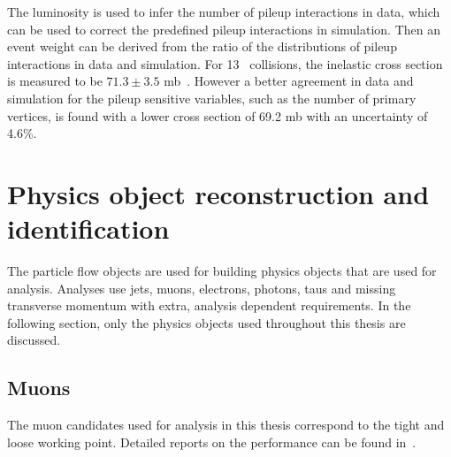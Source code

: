 The luminosity is used to infer the number of pileup interactions in data, which can be used to correct the predefined pileup interactions in simulation. Then an event weight can be derived from the ratio of the distributions of pileup interactions in data and simulation. For 13 \TeV\ collisions, the inelastic cross section is measured to be $71.3\pm3.5$ mb~\cite{CMS-PAS-FSQ-15-005}. However a better agreement in data and simulation for the pileup sensitive variables, such as the number of primary vertices, is found with a lower cross section of 69.2 mb with an uncertainty of 4.6\%. %




\section{Physics object reconstruction and identification}
\label{sec:PhysicsObject}
The particle flow objects are used for building physics objects that are used for analysis. Analyses use jets, muons, electrons, photons, taus and missing transverse momentum \ptmisvec with extra, analysis dependent requirements. In the following section, only the physics objects used throughout this thesis are discussed. 

\subsection{Muons}
\label{sec:MuonID}
The muon candidates used for analysis in this thesis correspond to the tight and loose working point. Detailed reports on the performance can be found in~\cite{CMS-DP-2017-007}.

